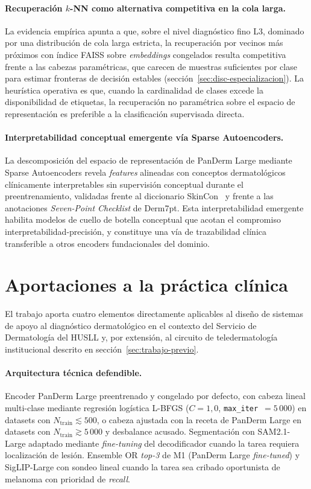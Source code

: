 \paragraph{Recuperación $k$-NN como alternativa competitiva en la
cola larga.}
La evidencia empírica apunta a que, sobre el nivel diagnóstico fino
L3, dominado por una distribución de cola larga estricta, la
recuperación por vecinos más próximos con índice FAISS sobre
\emph{embeddings} congelados resulta competitiva frente a las
cabezas paramétricas, que carecen de muestras suficientes por clase
para estimar fronteras de decisión estables
(sección~\ref{sec:disc-especializacion}). La heurística operativa
es que, cuando la cardinalidad de clases excede la disponibilidad de
etiquetas, la recuperación no paramétrica sobre el espacio de
representación es preferible a la clasificación supervisada directa.

\paragraph{Interpretabilidad conceptual emergente vía Sparse
Autoencoders.}
La descomposición del espacio de representación de PanDerm Large
mediante Sparse Autoencoders revela \emph{features} alineadas con
conceptos dermatológicos clínicamente interpretables sin supervisión
conceptual durante el preentrenamiento, validadas frente al
diccionario SkinCon~\cite{skincon} y frente a las anotaciones
\emph{Seven-Point Checklist} de Derm7pt. Esta interpretabilidad
emergente habilita modelos de cuello de botella conceptual que
acotan el compromiso interpretabilidad-precisión, y constituye una
vía de trazabilidad clínica transferible a otros encoders
fundacionales del dominio.

\section{Aportaciones a la práctica clínica}
\label{sec:aportaciones-clinicas}

El trabajo aporta cuatro elementos directamente aplicables al
diseño de sistemas de apoyo al diagnóstico dermatológico en el
contexto del Servicio de Dermatología del HUSLL y, por extensión,
al circuito de teledermatología institucional descrito en
sección~\ref{sec:trabajo-previo}.

\paragraph{Arquitectura técnica defendible.}
Encoder PanDerm Large preentrenado y congelado por defecto, con
cabeza lineal multi-clase mediante regresión logística L-BFGS
($C = 1{,}0$, \texttt{max\_iter}~$=5\,000$) en datasets con
$N_{\mathrm{train}} \lesssim 500$, o cabeza ajustada con la
receta de PanDerm Large en datasets con
$N_{\mathrm{train}} \gtrsim 5\,000$ y desbalance acusado.
Segmentación con SAM2.1-Large adaptado mediante \emph{fine-tuning}
del decodificador cuando la tarea requiera localización de lesión. Ensemble OR \emph{top-3}
de M1 (PanDerm Large \emph{fine-tuned}) y SigLIP-Large con sondeo
lineal cuando la tarea sea cribado oportunista de melanoma con
prioridad de \emph{recall}.

